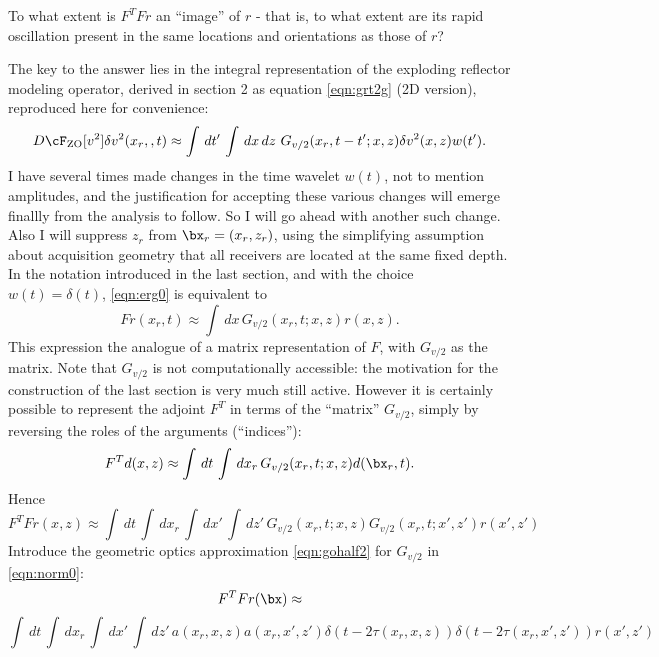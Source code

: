 To what extent is $F^TFr$ an ``image'' of $r$ - that is, to what extent are its rapid oscillation present in the same locations and orientations as those of $r$?

The key to the answer lies in the integral representation of the exploding reflector modeling operator, derived in section 2 as equation \ref{eqn:grt2g} (2D version), reproduced here for convenience: 
\begin{equation}
\label{eqn:erg0}
D\cF_{\rm ZO}[v^2]\delta v^2(x_r,,t) \approx  \int\, dt'\,\int \, dx\,dz\, \, G_{v/2}(x_r,t-t';x,z) \delta v^2(x,z) w(t'). 
\end{equation}
I have several times made changes in the time wavelet $w(t)$, not to mention amplitudes, and the justification for accepting these various changes will emerge finallly from the analysis to follow. So I will go ahead with another such change. Also I will suppress $z_r$ from $\bx_r=(x_r,z_r)$, using the simplifying assumption about acquisition geometry that all receivers are located at the same fixed depth.
In the notation introduced in the last section, and with the choice $w(t) = \delta(t)$, \ref{eqn:erg0} is equivalent to 
\begin{equation}
\label{eqn:erg}
Fr(x_r,t) \approx \int \, dx \, G_{v/2}(x_r,t;x,z) r(x,z). 
\end{equation}
This expression the analogue of a matrix representation of $F$, with $G_{v/2}$ as the matrix. Note that $G_{v/2}$ is not computationally accessible: the motivation for the construction of the last section is very much still active. However it is certainly possible to represent the adjoint $F^T$ in terms of the ``matrix'' $G_{v/2}$, simply by reversing the roles of the arguments (``indices''):
\begin{equation}
\label{eqn:erg}
F^Td(x,z) \approx  \int\, dt\,\int \, dx_r \, G_{v/2}(x_r,t;x,z) d(\bx_r,t). 
\end{equation}
Hence 
\begin{equation}
\label{eqn:norm0}
F^TFr(x,z) \approx \int\, dt\,\int \, dx_r \, \int \, dx'\,\int\,dz' \, G_{v/2}(x_r,t;x,z) G_{v/2}(x_r,t;x',z') r(x',z')
\end{equation}
Introduce the geometric optics approximation \ref{eqn:gohalf2} for $G_{v/2}$ in \ref{eqn:norm0}:
\[
F^TFr(\bx) \approx 
\]
\begin{equation}
\label{eqn:normgo}
\int\, dt\,\int \, dx_r \, \int \, dx'\,\int\,dz'\, a(x_r,x,z)a(x_r,x',z')\delta(t-2\tau(x_r,x,z))\delta(t-2\tau(x_r,x',z'))r(x',z')
\end{equation}
